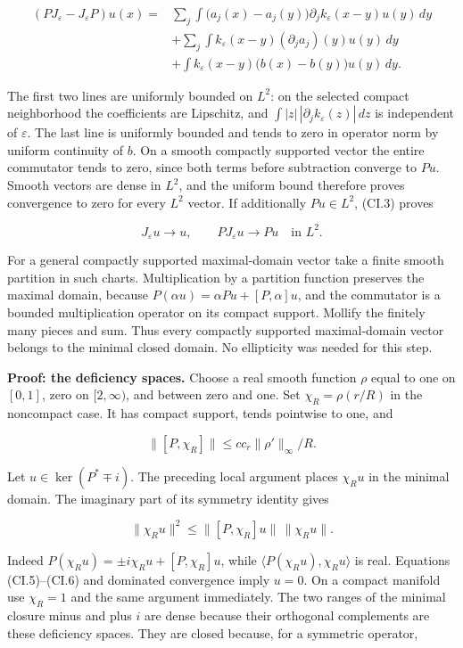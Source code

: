 \documentclass[
  11pt,
]{article}
\begin{document}
\[
\begin{split}
 (PJ_\varepsilon-J_\varepsilon P)u(x)
 ={}&\sum_j\int\big(a_j(x)-a_j(y)\big)
       \partial_j k_\varepsilon(x-y)u(y)\,dy\\
 &+\sum_j\int k_\varepsilon(x-y)(\partial_j a_j)(y)u(y)\,dy\\
 &+\int k_\varepsilon(x-y)\big(b(x)-b(y)\big)u(y)\,dy.
\end{split}
 \tag{CI.3}
\]

The first two lines are uniformly bounded on \(L^2\): on the selected
compact neighborhood the coefficients are Lipschitz, and
\(\int |z|\,|\partial_jk_\varepsilon(z)|\,dz\) is independent of
\(\varepsilon\). The last line is uniformly bounded and tends to zero in
operator norm by uniform continuity of \(b\). On a smooth compactly
supported vector the entire commutator tends to zero, since both terms
before subtraction converge to \(Pu\). Smooth vectors are dense in
\(L^2\), and the uniform bound therefore proves convergence to zero for
every \(L^2\) vector. If additionally \(Pu\in L^2\), (CI.3) proves

\[
 J_\varepsilon u\longrightarrow u,\qquad
 PJ_\varepsilon u\longrightarrow Pu
 \quad\text{in }L^2.
 \tag{CI.4}
\]

For a general compactly supported maximal-domain vector take a finite
smooth partition in such charts. Multiplication by a partition function
preserves the maximal domain, because
\(P(\alpha u)=\alpha Pu+[P,\alpha]u\), and the commutator is a bounded
multiplication operator on its compact support. Mollify the finitely
many pieces and sum. Thus every compactly supported maximal-domain
vector belongs to the minimal closed domain. No ellipticity was needed
for this step.

\textbf{Proof: the deficiency spaces.} Choose a real smooth function
\(\rho\) equal to one on \([0,1]\), zero on \([2,\infty)\), and between
zero and one. Set \(\chi_R=\rho(r/R)\) in the noncompact case. It has
compact support, tends pointwise to one, and

\[
 \|[P,\chi_R]\|\leq cc_r\|\rho'\|_\infty/R.
 \tag{CI.5}
\]

Let \(u\in\ker(P^*\mp i)\). The preceding local argument places
\(\chi_Ru\) in the minimal domain. The imaginary part of its symmetry
identity gives

\[
 \|\chi_Ru\|^2
 \leq \|[P,\chi_R]u\|\,\|\chi_Ru\|.
 \tag{CI.6}
\]

Indeed \(P(\chi_Ru)=\pm i\chi_Ru+[P,\chi_R]u\), while
\(\langle P(\chi_Ru),\chi_Ru\rangle\) is real. Equations (CI.5)--(CI.6)
and dominated convergence imply \(u=0\). On a compact manifold use
\(\chi_R=1\) and the same argument immediately. The two ranges of the
minimal closure minus and plus \(i\) are dense because their orthogonal
complements are these deficiency spaces. They are closed because, for a
symmetric operator,
\end{document}
